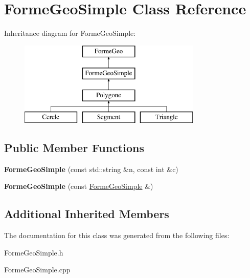 \hypertarget{class_forme_geo_simple}{}\section{Forme\+Geo\+Simple Class Reference}
\label{class_forme_geo_simple}
Inheritance diagram for Forme\+Geo\+Simple\+:\begin{figure}[H]
\begin{center}
\leavevmode
\includegraphics[height=4.000000cm]{de/d29/class_forme_geo_simple}
\end{center}
\end{figure}
\subsection*{Public Member Functions}
\begin{DoxyCompactItemize}
\item 
\mbox{\label{class_forme_geo_simple_a9f2c15c080bcc1243f739aa12701ebd8}} 
{\bfseries Forme\+Geo\+Simple} (const std\+::string \&n, const int \&c)
\item 
\mbox{\label{class_forme_geo_simple_a008fa4de9033b87f7c78c77671c23313}} 
{\bfseries Forme\+Geo\+Simple} (const \mbox{\hyperlink{class_forme_geo_simple}{Forme\+Geo\+Simple}} \&)
\end{DoxyCompactItemize}
\subsection*{Additional Inherited Members}


The documentation for this class was generated from the following files\+:\begin{DoxyCompactItemize}
\item 
Forme\+Geo\+Simple.\+h\item 
Forme\+Geo\+Simple.\+cpp\end{DoxyCompactItemize}
